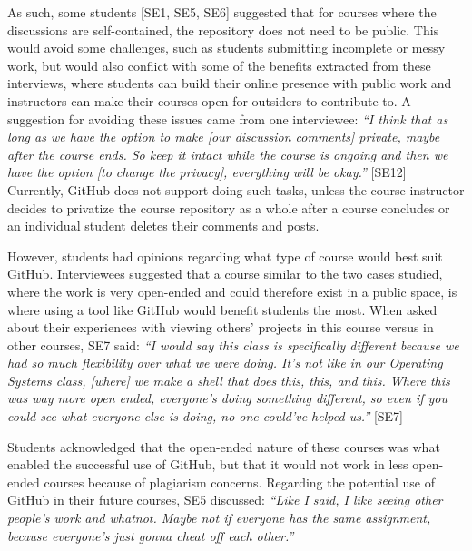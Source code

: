 As such, some students [SE1, SE5, SE6] suggested that for courses where the discussions are self-contained, the repository does not need to be public. This would avoid some challenges, such as students submitting incomplete or messy work, but would also conflict with some of the benefits extracted from these interviews, where students can build their online presence with public work and instructors can make their courses open for outsiders to contribute to. A suggestion for avoiding these issues came from one interviewee: \textit{``I think that as long as we have the option to make [our discussion comments] private, maybe after the course ends. So keep it intact while the course is ongoing and then we have the option [to change the privacy], everything will be okay.''} [SE12] Currently, GitHub does not support doing such tasks, unless the course instructor decides to privatize the course repository as a whole after a course concludes or an individual student deletes their comments and posts. %

However, students had opinions regarding what type of course would best suit GitHub. Interviewees suggested that a course similar to the two cases studied, where the work is very open-ended and could therefore exist in a public space, is where using a tool like GitHub would benefit students the most. When asked about their experiences with viewing others' projects in this course versus in other courses, SE7 said: \textit{``I would say this class is specifically different because we had so much flexibility over what we were doing. It's not like in our Operating Systems class, [where] we make a shell that does this, this, and this. Where this was way more open ended, everyone's doing something different, so even if you could see what everyone else is doing, no one could've helped us.''} [SE7]

Students acknowledged that the open-ended nature of these courses was what enabled the successful use of GitHub, but that it would not work in less open-ended courses because of plagiarism concerns. Regarding the potential use of GitHub in their future courses, SE5 discussed: \textit{``Like I said, I like seeing other people's work and whatnot. Maybe not if everyone has the same assignment, because everyone's just gonna cheat off each other.''}


